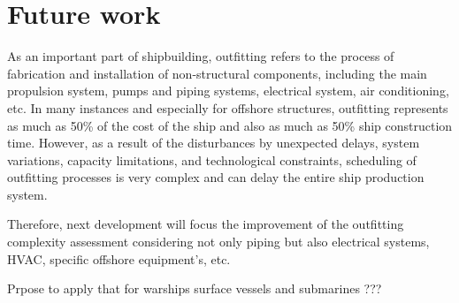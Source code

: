 \section{Future work}
As an important part of shipbuilding, outfitting refers to the process of fabrication and installation of non-structural components, including the main propulsion system, pumps and piping systems, electrical system, air conditioning, etc. In many instances and especially for offshore structures, outfitting represents as much as 50\% of the cost of the ship and also as much as 50\% ship construction time. However, as a result of the disturbances by unexpected delays, system variations, capacity limitations, and technological constraints, scheduling of outfitting processes is very complex and can delay the entire ship production system.

Therefore, next development will focus the improvement of the outfitting complexity assessment considering not only piping but also electrical systems, HVAC, specific offshore equipment's, etc.

Prpose to apply that for warships surface vessels and submarines ???